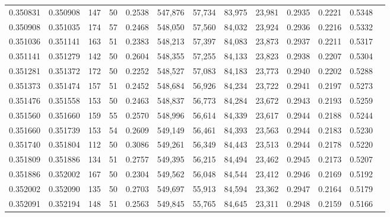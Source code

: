 \begin{tabular}{rrrrrrrrrrrrr}
0.350831 & 0.350908 &   147 &  50 &                                     0.2538 & 547,876 &  57,734 &  83,975 &  23,981 & 0.2935 & 0.2221 & 0.5348 \\
0.350908 & 0.351035 &   174 &  57 &                                     0.2468 & 548,050 &  57,560 &  84,032 &  23,924 & 0.2936 & 0.2216 & 0.5332 \\
0.351036 & 0.351141 &   163 &  51 &                                     0.2383 & 548,213 &  57,397 &  84,083 &  23,873 & 0.2937 & 0.2211 & 0.5317 \\
0.351141 & 0.351279 &   142 &  50 &                                     0.2604 & 548,355 &  57,255 &  84,133 &  23,823 & 0.2938 & 0.2207 & 0.5304 \\
0.351281 & 0.351372 &   172 &  50 &                                     0.2252 & 548,527 &  57,083 &  84,183 &  23,773 & 0.2940 & 0.2202 & 0.5288 \\
0.351373 & 0.351474 &   157 &  51 &                                     0.2452 & 548,684 &  56,926 &  84,234 &  23,722 & 0.2941 & 0.2197 & 0.5273 \\
0.351476 & 0.351558 &   153 &  50 &                                     0.2463 & 548,837 &  56,773 &  84,284 &  23,672 & 0.2943 & 0.2193 & 0.5259 \\
0.351560 & 0.351660 &   159 &  55 &                                     0.2570 & 548,996 &  56,614 &  84,339 &  23,617 & 0.2944 & 0.2188 & 0.5244 \\
0.351660 & 0.351739 &   153 &  54 &                                     0.2609 & 549,149 &  56,461 &  84,393 &  23,563 & 0.2944 & 0.2183 & 0.5230 \\
0.351740 & 0.351804 &   112 &  50 &                                     0.3086 & 549,261 &  56,349 &  84,443 &  23,513 & 0.2944 & 0.2178 & 0.5220 \\
0.351809 & 0.351886 &   134 &  51 &                                     0.2757 & 549,395 &  56,215 &  84,494 &  23,462 & 0.2945 & 0.2173 & 0.5207 \\
0.351886 & 0.352002 &   167 &  50 &                                     0.2304 & 549,562 &  56,048 &  84,544 &  23,412 & 0.2946 & 0.2169 & 0.5192 \\
0.352002 & 0.352090 &   135 &  50 &                                     0.2703 & 549,697 &  55,913 &  84,594 &  23,362 & 0.2947 & 0.2164 & 0.5179 \\
0.352091 & 0.352194 &   148 &  51 &                                     0.2563 & 549,845 &  55,765 &  84,645 &  23,311 & 0.2948 & 0.2159 & 0.5166 \\

\end{tabular}
